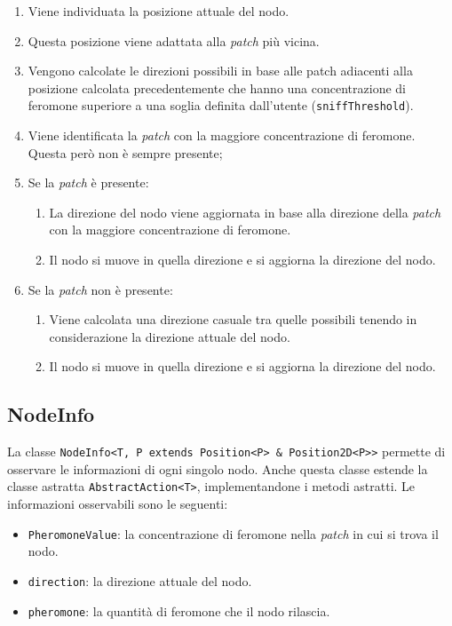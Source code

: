 \begin{enumerate}
    \item Viene individuata la posizione attuale del nodo.
    \item Questa posizione viene adattata alla \textit{patch} più vicina.
    \item Vengono calcolate le direzioni possibili in base alle patch adiacenti alla posizione calcolata precedentemente che hanno una 
    concentrazione di feromone superiore a una soglia definita dall'utente
    (\texttt{sniffThreshold}).
    \item Viene identificata la \textit{patch} con la maggiore concentrazione di feromone. Questa però non è sempre presente;
    \item Se la \textit{patch} è presente:
    \begin{enumerate}
        \item La direzione del nodo viene aggiornata in base alla direzione della \textit{patch} con la maggiore concentrazione di feromone.
        \item Il nodo si muove in quella direzione e si aggiorna la direzione del nodo.
    \end{enumerate}
    \item Se la \textit{patch} non è presente:
    \begin{enumerate}
        \item Viene calcolata una direzione casuale tra quelle possibili tenendo in considerazione la direzione attuale del nodo.
        \item Il nodo si muove in quella direzione e si aggiorna la direzione del nodo.
    \end{enumerate}
\end{enumerate}

\subsection{NodeInfo}
La classe \texttt{NodeInfo<T, P extends Position<P> \& Position2D<P>>} permette di osservare le informazioni di ogni singolo nodo. Anche questa
classe estende la classe astratta \texttt{AbstractAction<T>}, implementandone i metodi astratti. Le informazioni osservabili sono le seguenti:
\begin{itemize}
    \item \texttt{PheromoneValue}: la concentrazione di feromone nella \textit{patch} in cui si trova il nodo.
    \item \texttt{direction}: la direzione attuale del nodo.
    \item \texttt{pheromone}: la quantità di feromone che il nodo rilascia.
\end{itemize}

